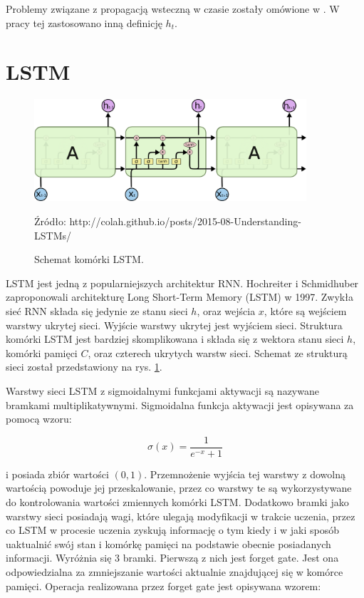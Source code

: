 \documentclass[oneside, mag]{mgr}
\begin{document}
Problemy związane z propagacją wsteczną w czasie zostały omówione w \cite{DBLP:journals/corr/abs-1211-5063}. W pracy tej zastosowano inną definicję $h_t$.

\section{LSTM}

\begin{figure}
\centering
	\includegraphics[width=0.90\textwidth]{img/lstm_colah.png}
	\caption{Schemat komórki LSTM.} Źródło: http://colah.github.io/posts/2015-08-Understanding-LSTMs/
	\label{fig:lstm}
\end{figure}

LSTM jest jedną z popularniejszych architektur RNN. Hochreiter i Schmidhuber zaproponowali architekturę Long Short-Term Memory (LSTM) \cite{LSTM} w 1997. Zwykła sieć RNN składa się jedynie ze stanu sieci $h$, oraz wejścia $x$, które są wejściem warstwy ukrytej sieci. Wyjście warstwy ukrytej jest wyjściem sieci. Struktura komórki LSTM jest bardziej skomplikowana i składa się z wektora stanu sieci $h$, komórki pamięci $C$, oraz czterech ukrytych warstw sieci. Schemat ze strukturą sieci został przedstawiony na rys. \ref{fig:lstm}.

Warstwy sieci LSTM z sigmoidalnymi funkcjami aktywacji są nazywane bramkami multiplikatywnymi. Sigmoidalna funkcja aktywacji jest opisywana za pomocą wzoru:

\begin{equation}
	\sigma(x) = \frac{1}{e^{-x} + 1}
\end{equation}

i posiada zbiór wartości $(0, 1)$. Przemnożenie wyjścia tej warstwy z dowolną wartością powoduje jej przeskalowanie, przez co warstwy te są wykorzystywane do kontrolowania wartości zmiennych komórki LSTM. Dodatkowo bramki jako warstwy sieci posiadają wagi, które ulegają modyfikacji w trakcie uczenia, przez co LSTM w procesie uczenia zyskują informację o tym kiedy i w jaki sposób uaktualnić swój stan i komórkę pamięci na podstawie obecnie posiadanych informacji. Wyróżnia się 3 bramki. Pierwszą z nich jest forget gate. Jest ona odpowiedzialna za zmniejszanie wartości aktualnie znajdującej się w komórce pamięci. Operacja realizowana przez forget gate jest opisywana wzorem: 
\end{document}
